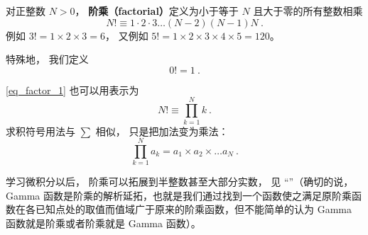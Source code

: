 
\begin{issues}
\issueDraft
\end{issues}

对正整数 $N > 0$， \textbf{阶乘（factorial）}定义为小于等于 $N$ 且大于零的所有整数相乘
\begin{equation}\label{eq_factor_1}
N! \equiv 1 \cdot 2 \cdot 3 \dots (N - 2) (N - 1)N~.
\end{equation}
例如 $3! = 1\times 2\times 3 = 6$， 又例如 $5! = 1\times 2\times 3\times 4\times 5 = 120$。

特殊地， 我们定义
\begin{equation}
0! = 1~.
\end{equation}

\autoref{eq_factor_1} 也可以用表示为
\begin{equation}
N! \equiv \prod_{k = 1}^N k~.
\end{equation}
求积符号用法与 $\sum$ 相似， 只是把加法变为乘法：
\begin{equation}
\prod_{k = 1}^N a_k = a_1\times a_2\times \dots a_N~.
\end{equation}

学习微积分以后， 阶乘可以拓展到半整数甚至大部分实数， 见 “”（确切的说，Gamma 函数是阶乘的解析延拓，也就是我们通过找到一个函数使之满足原阶乘函数在各已知点处的取值而值域广于原来的阶乘函数，但不能简单的认为 Gamma 函数就是阶乘或者阶乘就是 Gamma 函数）。
